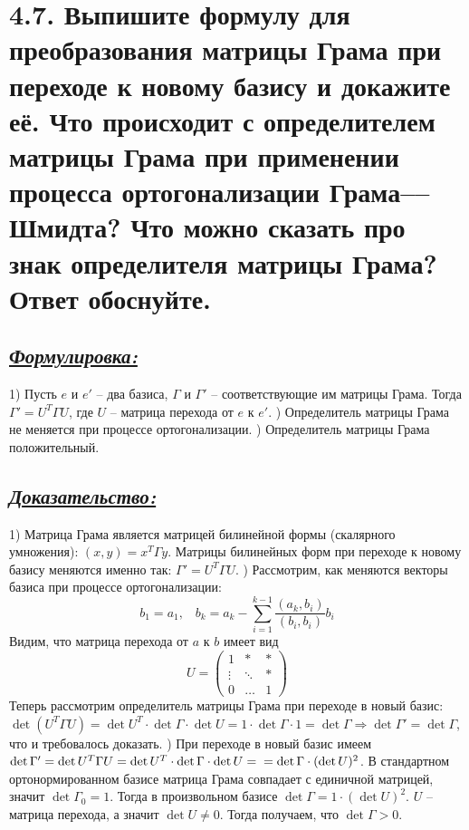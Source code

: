 \documentclass{article}
\begin{document}
\section*{\LARGE 4.7. Выпишите формулу для преобразования матрицы Грама при переходе к новому базису и докажите её. Что происходит с определителем матрицы Грама при применении процесса ортогонализации Грама––Шмидта? Что можно сказать про знак определителя матрицы Грама? Ответ обоснуйте.  }
\subsection*{\Large \underline{\textit{Формулировка: }}}
1) Пусть $e$ и $e'$ -- два базиса, $\Gamma$ и $\Gamma'$ -- соответствующие им матрицы Грама. Тогда $\Gamma' = U^T \Gamma U$, где $U$ -- матрица перехода от $e$ к $e'$.
) Определитель матрицы Грама не меняется при процессе ортогонализации. 
) Определитель матрицы Грама положительный.

\subsection*{\Large \underline{\textit{Доказательство: }}}
1) Матрица Грама является матрицей билинейной формы (скалярного умножения): $(x, y) = x^T \Gamma y$. Матрицы билинейных форм при переходе к новому базису меняются именно так: $\Gamma' = U^T \Gamma U$.
) Рассмотрим, как меняются векторы базиса при процессе ортогонализации:
$$
b_1 = a_1, \;\;\; b_k = a_k - \sum_{i = 1}^{k-1} \frac{(a_k, b_i)}{(b_i, b_i)}b_i
$$
Видим, что матрица перехода от $a$ к $b$ имеет вид
$$
U = 
\begin{pmatrix}
1 & \ast & \ast \\
\vdots & \ddots & \ast \\
0 & \dots & 1
\end{pmatrix}
$$
Теперь рассмотрим определитель матрицы Грама при переходе в новый базис: $\det(U^T \Gamma U) = \det{U^T}\cdot \det{\Gamma} \cdot \det{U} = 1 \cdot \det{\Gamma} \cdot 1 = \det{\Gamma} \Rightarrow \det{\Gamma'} = \det{\Gamma}$, что и требовалось доказать.
) При переходе в новый базис имеем $\det{\Gamma'} = \det{U^T \Gamma U} = \det{U^T} \cdot \det{\Gamma} \cdot \det{U} = \newline = \det{\Gamma}\cdot(\det{U})^2$. В стандартном ортонормированном базисе матрица Грама совпадает с единичной матрицей, значит $\det{\Gamma_0} = 1$. Тогда в произвольном базисе $\det{\Gamma} = 1 \cdot (\det{U})^2$. $U$ -- матрица перехода, а значит $\det{U} \ne 0$. Тогда получаем, что $\det{\Gamma} > 0$.
\end{document}

